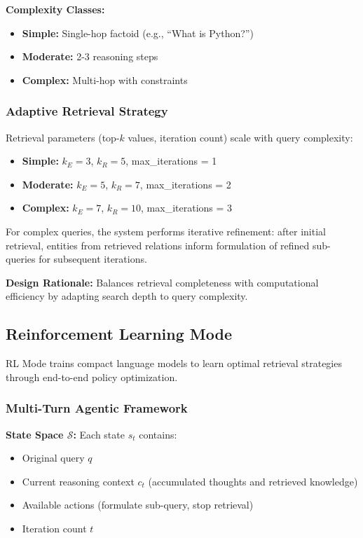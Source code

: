 \documentclass[11pt,a4paper]{article}
\begin{document}
\textbf{Complexity Classes:}
\begin{itemize}
    \item \textbf{Simple:} Single-hop factoid (e.g., ``What is Python?'')
    \item \textbf{Moderate:} 2-3 reasoning steps
    \item \textbf{Complex:} Multi-hop with constraints
\end{itemize}

\subsubsection{Adaptive Retrieval Strategy}

Retrieval parameters (top-$k$ values, iteration count) scale with query complexity:

\begin{itemize}
    \item \textbf{Simple:} $k_E = 3$, $k_R = 5$, max\_iterations = 1
    \item \textbf{Moderate:} $k_E = 5$, $k_R = 7$, max\_iterations = 2
    \item \textbf{Complex:} $k_E = 7$, $k_R = 10$, max\_iterations = 3
\end{itemize}

For complex queries, the system performs iterative refinement: after initial retrieval, entities from retrieved relations inform formulation of refined sub-queries for subsequent iterations.

\textbf{Design Rationale:} Balances retrieval completeness with computational efficiency by adapting search depth to query complexity.

\subsection{Reinforcement Learning Mode}

RL Mode trains compact language models to learn optimal retrieval strategies through end-to-end policy optimization.

\subsubsection{Multi-Turn Agentic Framework}

\textbf{State Space $\mathcal{S}$:} Each state $s_t$ contains:
\begin{itemize}
    \item Original query $q$
    \item Current reasoning context $c_t$ (accumulated thoughts and retrieved knowledge)
    \item Available actions (formulate sub-query, stop retrieval)
    \item Iteration count $t$
\end{itemize}
\end{document}

